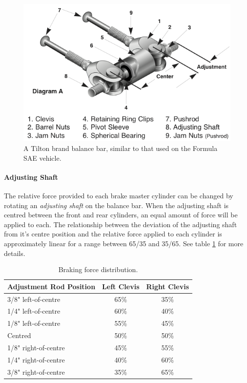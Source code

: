 \begin{figure}[h!]
	\centering
	 	\includegraphics[scale=1.0]{figures/balance_bar_diag.png}
    \caption{A Tilton brand balance bar, similar to that used on the Formula SAE vehicle.}
    \label{fig:balance_bar_diag}
\end{figure}

\paragraph{Adjusting Shaft}

The relative force provided to each brake master cylinder can be changed by rotating an \emph{adjusting shaft} on the balance bar. When the adjusting shaft is centred between the front and rear cylinders, an equal amount of force will be applied to each. The relationship between the deviation of the adjusting shaft from it's centre position and the relative force applied to each cylinder is approximately linear for a range between 65/35 and 35/65. See table \ref{table:bb_force_distribution} for more details.

\begin{table}[H]
	\centering
	\caption{Braking force distribution.}
	\label{table:bb_force_distribution}	
	\begin{tabular}{| l | c | c |}
		\hline Adjustment Rod Position & Left Clevis & Right Clevis  \\ \hline
		\hline 3/8" left-of-centre & 65\% & 35\% \\ 
		\hline 1/4" left-of-centre & 60\% & 40\% \\
		\hline 1/8" left-of-centre & 55\% & 45\% \\
		\hline Centred & 50\% & 50\% \\
		\hline 1/8" right-of-centre & 45\% & 55\% \\
		\hline 1/4" right-of-centre & 40\% & 60\% \\
		\hline 3/8" right-of-centre & 35\% & 65\% \\
		\hline
	\end{tabular}
\end{table}

